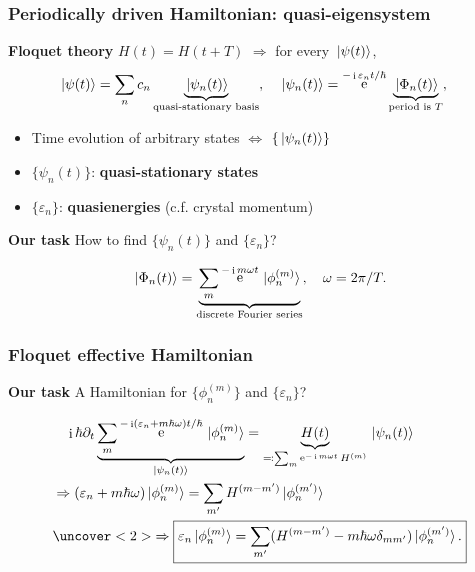 \documentclass[t]{beamer}
\DeclareMathOperator{\ee}{e}
\DeclareMathOperator{\ii}{i}
\newcommand{\concept}[1]{\textbf{#1}}
\begin{document}
\begin{frame}
\frametitle{Periodically driven Hamiltonian: quasi-eigensystem}

\textbf{Floquet theory} $H(t) = H(t + T)$ $\Rightarrow$ 
for every $\ket*{\psi(t)}$, 
\begin{equation*}
    \begin{aligned}
        &\ket*{\psi(t)} = \sum_n c_n \underbrace{\ket*{\psi_n(t)}}_{\text{quasi-stationary basis}} , \quad 
        \ket*{\psi_n(t)} = \ee^{- \ii \varepsilon_n t / \hbar} \underbrace{
            \ket*{\Phi_n(t)}
        }_\text{period is $T$} ,
    \end{aligned}
\end{equation*}

\begin{itemize}
    \item Time evolution of arbitrary states $\Leftrightarrow$ $\{\ket*{\psi_n(t)}\}$
    \item $\{\psi_n(t)\}$: \concept{quasi-stationary states}
    \item $\{\varepsilon_n\}$: \concept{quasienergies} (c.f. crystal momentum)
\end{itemize}

\vspace{0.5cm}

\textbf{Our task} How to find $\{ \psi_n(t) \}$ and $\{ \varepsilon_n \}$?

\begin{equation*}
    \ket*{\Phi_n(t)} = \underbrace{\sum_m \ee^{- \ii m \omega t} \ket*{\phi_n^{(m)}}}_{\text{discrete Fourier series}} , \quad 
    \omega = 2\pi / T. 
\end{equation*}


\end{frame}

\begin{frame}
\frametitle{Floquet effective Hamiltonian}

\textbf{Our task} A Hamiltonian for $\{ \phi_n^{(m)} \}$ and $\{ \varepsilon_n \}$? 

\[
    \begin{aligned}
        &\quad 
        \ii \hbar \partial_t \underbrace{\sum_{m} \ee^{-\ii (\varepsilon_n + m \hbar \omega) t / \hbar} \ket*{\phi_n^{(m)}}}_{\ket*{\psi_n(t)}}  = \underbrace{H(t)}_{\eqqcolon \sum_m \ee^{- \ii m \omega t} H^{(m)}} \ket*{\psi_n(t)} \\
        &\Rightarrow (\varepsilon_n + m \hbar \omega) \ket*{\phi_n^{(m)}} = \sum_{m'} H^{(m - m')} \ket*{\phi^{(m')}_n} \\
        &\uncover<2>{
            \Rightarrow \boxed{\varepsilon_n \ket*{\phi_n^{(m)}}
            = \sum_{m'} (H^{(m-m')} - m \hbar \omega \delta_{mm'})  \ket*{\phi_n^{(m')}}.}
        }
    \end{aligned}
\]


\end{frame}
\end{document}
